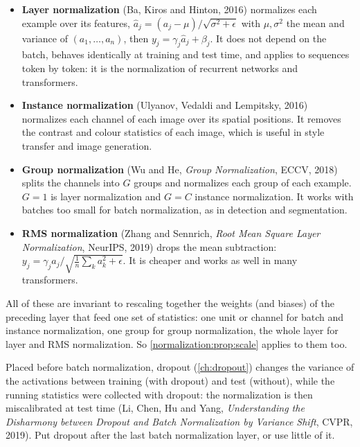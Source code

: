 \begin{notechapter}
\begin{itemize}
  \item \textbf{Layer normalization} (Ba, Kiros and Hinton, 2016) normalizes each example over
        its features, $\hat a_j = (a_j - \mu)/\sqrt{\sigma^2 + \epsilon}$ with $\mu,\sigma^2$ the mean and variance of $(a_1,\dots,a_n)$, then
        $y_j = \gamma_j\hat a_j + \beta_j$. It does not depend on the batch, behaves identically at training and test
        time, and applies to sequences token by token: it is the normalization of recurrent
        networks and transformers.
  \item \textbf{Instance normalization} (Ulyanov, Vedaldi and Lempitsky, 2016) normalizes each
        channel of each image over its spatial positions. It removes the contrast and colour
        statistics of each image, which is useful in style transfer and image generation.
  \item \textbf{Group normalization} (Wu and He, \emph{Group Normalization}, ECCV, 2018) splits the
        channels into $G$ groups and normalizes each group of each example. $G = 1$ is layer
        normalization and $G = C$ instance normalization. It works with batches too small for batch
        normalization, as in detection and segmentation.
  \item \textbf{RMS normalization} (Zhang and Sennrich, \emph{Root Mean Square Layer Normalization},
        NeurIPS, 2019) drops the mean subtraction: $y_j = \gamma_ja_j/\sqrt{\frac1n\sum_ka_k^2 + \epsilon}$. It is cheaper and works as
        well in many transformers.
\end{itemize}
All of these are invariant to rescaling together the weights (and biases) of the preceding
layer that feed one set of statistics: one unit or channel for batch and instance normalization,
one group for group normalization, the whole layer for layer and RMS normalization. So \cref{normalization:prop:scale} applies
to them too.

\begin{pitfall}
Placed before batch normalization, dropout (\cref{ch:dropout}) changes the variance of the
activations between training (with dropout) and test (without), while the running statistics
were collected with dropout: the normalization is then miscalibrated at test time (Li,
Chen, Hu and Yang, \emph{Understanding the Disharmony between Dropout and Batch
Normalization by Variance Shift}, CVPR, 2019). Put dropout after the last batch
normalization layer, or use little of it.
\end{pitfall}


\end{notechapter}
